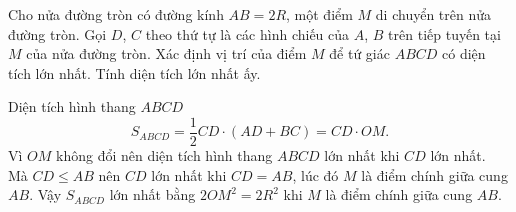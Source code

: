 \begin{bt}
Cho nửa đường tròn có đường kính $AB=2R$, một điểm $M$ di chuyển trên nửa đường tròn. Gọi $D$, $C$ theo thứ tự là các hình chiếu của $A$, $B$ trên tiếp tuyến tại $M$ của nửa đường tròn. Xác định vị trí của điểm $M$ để tứ giác $ABCD$ có diện tích lớn nhất. Tính diện tích lớn nhất ấy.
\loigiai
{
\immini
{
Diện tích hình thang $ABCD$
$$S_{ABCD}=\dfrac{1}{2}CD \cdot (AD+BC)=CD\cdot OM.$$
Vì $OM$ không đổi nên diện tích hình thang $ABCD$ lớn nhất khi $CD$ lớn nhất.\\
Mà $CD \le AB$ nên $CD$ lớn nhất khi $CD=AB$, lúc đó $M$ là điểm chính giữa cung $AB$.
Vậy $S_{ABCD}$ lớn nhất bằng $2OM^2 = 2R^2$ khi $M$ là điểm chính giữa cung $AB$.
}
{
}
}
\end{bt}